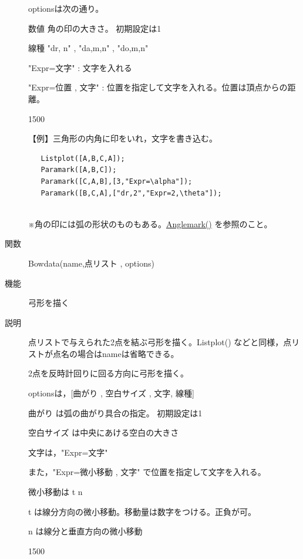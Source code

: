 \documentclass[papersize,a4paper,12pt,uplatex]{jsarticle}
\begin{document}
\begin{description}
optionsは次の通り。

数値  角の印の大きさ。 初期設定は1

線種  "dr, n"  , "da,m,n" , "do,m,n"

"Expr=文字"  : 文字を入れる

"Expr=位置 , 文字"  : 位置を指定して文字を入れる。位置は頂点からの距離。

\vspace{\baselineskip}
\begin{layer}{150}{0}
\end{layer}


【例】三角形の内角に印をいれ，文字を書き込む。

\begin{verbatim}
   Listplot([A,B,C,A]);
   Paramark([A,B,C]);
   Paramark([C,A,B],[3,"Expr=\alpha"]);
   Paramark([B,C,A],["dr,2","Expr=2,\theta"]);
   
\end{verbatim}

※角の印には弧の形状のものもある。\hyperlink{anglemark}{Anglemark()} を参照のこと。\\

\vspace{\baselineskip}
\hypertarget{bowdata}{}
\item[関数]  Bowdata(name,点リスト , options)
\item[機能]  弓形を描く
\item[説明]  点リストで与えられた2点を結ぶ弓形を描く。Listplot() などと同様，点リストが点名の場合はnameは省略できる。

2点を反時計回りに回る方向に弓形を描く。

optionsは，[曲がり , 空白サイズ  , 文字, 線種]

曲がり  は弧の曲がり具合の指定。 初期設定は1

空白サイズ  は中央にあける空白の大きさ

文字は，"Expr=文字" 

また，"Expr=微小移動 , 文字"  で位置を指定して文字を入れる。

微小移動は t  n 

 t は線分方向の微小移動。移動量は数字をつける。正負が可。

 n は線分と垂直方向の微小移動

\vspace{\baselineskip}
 \begin{layer}{150}{0}
 \end{layer}


\end{description}
\end{document}
